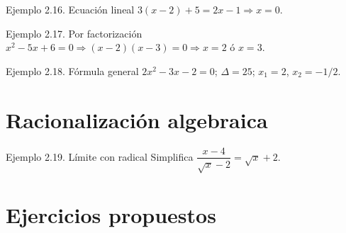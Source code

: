 \documentclass[12pt,letterpaper]{book}
\begin{document}
\begin{ejbox}{Ejemplo 2.16. Ecuación lineal}
$3(x-2)+5=2x-1\Rightarrow x=0$.
\end{ejbox}

\begin{ejbox}{Ejemplo 2.17. Por factorización}
$x^2-5x+6=0\Rightarrow(x-2)(x-3)=0\Rightarrow x=2$ ó $x=3$.
\end{ejbox}

\begin{ejbox}{Ejemplo 2.18. Fórmula general}
$2x^2-3x-2=0$; $\Delta=25$; $x_1=2$, $x_2=-1/2$.
\end{ejbox}

\section{Racionalización algebraica}

\begin{ejbox}{Ejemplo 2.19. Límite con radical}
Simplifica $\dfrac{x-4}{\sqrt x-2}=\sqrt x+2$.
\end{ejbox}

\section{Ejercicios propuestos}
\end{document}
